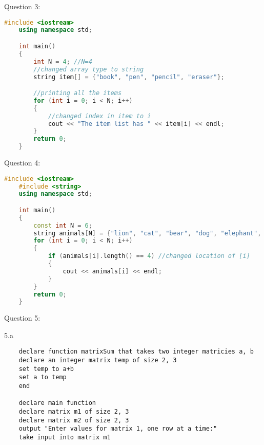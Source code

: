 \documentclass{article}
\begin{document}
\vspace{1cm}

Question 3:

\begin{lstlisting}[language=C++]
    #include <iostream>
    using namespace std;

    int main()
    {
        int N = 4; //N=4
        //changed array type to string
        string item[] = {"book", "pen", "pencil", "eraser"}; 

        //printing all the items
        for (int i = 0; i < N; i++)
        {
            //changed index in item to i
            cout << "The item list has " << item[i] << endl; 
        }
        return 0;
    }
\end{lstlisting}

\vspace{1cm}

Question 4:

\begin{lstlisting}[language=C++]
    #include <iostream>
    #include <string>
    using namespace std;

    int main() 
    {
        const int N = 6;
        string animals[N] = {"lion", "cat", "bear", "dog", "elephant", "fox"};
        for (int i = 0; i < N; i++) 
        {
            if (animals[i].length() == 4) //changed location of [i]
            {
                cout << animals[i] << endl;
            }
        }
        return 0;
    }
\end{lstlisting}

\vspace{1cm}

Question 5:

\hspace{0.5cm}5.a

\begin{verbatim}
    declare function matrixSum that takes two integer matricies a, b
    declare an integer matrix temp of size 2, 3
    set temp to a+b
    set a to temp
    end

    declare main function
    declare matrix m1 of size 2, 3
    declare matrix m2 of size 2, 3
    output "Enter values for matrix 1, one row at a time:"
    take input into matrix m1
\end{verbatim}
\end{document}
